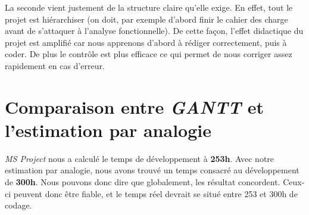 La seconde vient justement de la structure claire qu'elle exige. 
En effet, tout le projet est hiérarchiser (on doit, par exemple d'abord finir le cahier des charge avant de s'attaquer à l'analyse fonctionnelle). 
De cette façon, l'effet didactique du projet est amplifié car nous apprenons d'abord à rédiger correctement, puis à coder. 
De plus le contrôle est plus efficace ce qui permet de nous corriger assez rapidement en cas d'erreur.

\section{Comparaison entre \emph{GANTT} et l'estimation par analogie}
\emph{MS Project} nous a calculé le temps de développement à \textbf{253h}. 
Avec notre estimation par analogie, nous avons trouvé un temps consacré au développement de \textbf{300h}. 
Nous pouvons donc dire que globalement, les résultat concordent. 
Ceux-ci peuvent donc être fiable, et le temps réel devrait se situé entre 253 et 300h de codage. 
